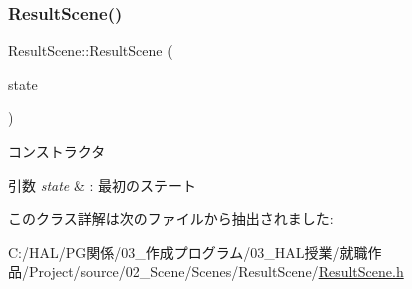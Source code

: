 \subsubsection{\texorpdfstring{Result\+Scene()}{ResultScene()}}
{\footnotesize\ttfamily Result\+Scene\+::\+Result\+Scene (\begin{DoxyParamCaption}\item[{\mbox{\hyperlink{class_scene_bace_1_1_state_abstract}{State\+Abstract}} $\ast$}]{state }\end{DoxyParamCaption})\hspace{0.3cm}{\ttfamily [inline]}}



コンストラクタ 


\begin{DoxyParams}{引数}
{\em state} & \+: 最初のステート \\
\hline
\end{DoxyParams}


このクラス詳解は次のファイルから抽出されました\+:\begin{DoxyCompactItemize}
\item 
C\+:/\+H\+A\+L/\+P\+G関係/03\+\_\+作成プログラム/03\+\_\+\+H\+A\+L授業/就職作品/\+Project/source/02\+\_\+\+Scene/\+Scenes/\+Result\+Scene/\mbox{\hyperlink{_result_scene_8h}{Result\+Scene.\+h}}\end{DoxyCompactItemize}
